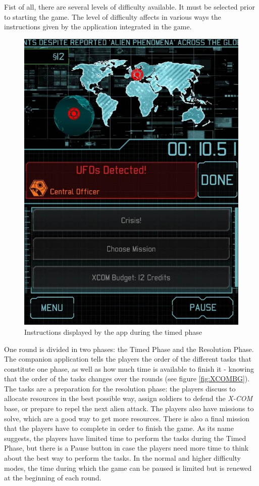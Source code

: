 Fist of all, there are several levels of difficulty available. It must be selected prior to starting the game. The level of difficulty affects in various ways the instructions given by the application integrated in the game.

\begin{figure}[h]
    \centering
    \includegraphics[scale=0.3]{Images/xcom_boardgame_app.jpg}
    \caption{Instructions displayed by the app during the timed phase}
    \label{fig:XCOMAPP}
\end{figure}


One round is divided in two phases: the Timed Phase and the Resolution Phase. The companion application tells the players the order of the different tasks that constitute one phase, as well as how much time is available to finish it - knowing that the order of the tasks changes over the rounds (see figure \ref{fig:XCOMBG}). The tasks are a preparation for the resolution phase: the players discuss to allocate resources in the best possible way, assign soldiers to defend the \textit{X-COM} base, or prepare to repel the next alien attack. The players also have missions to solve, which are a good way to get more resources. There is also a final mission that the players have to complete in order to finish the game. As its name suggests, the players have limited time to perform the tasks during the Timed Phase, but there is a Pause button in case the players need more time to think about the best way to perform the tasks. In the normal and higher difficulty modes, the time during which the game can be paused is limited but is renewed at the beginning of each round.

